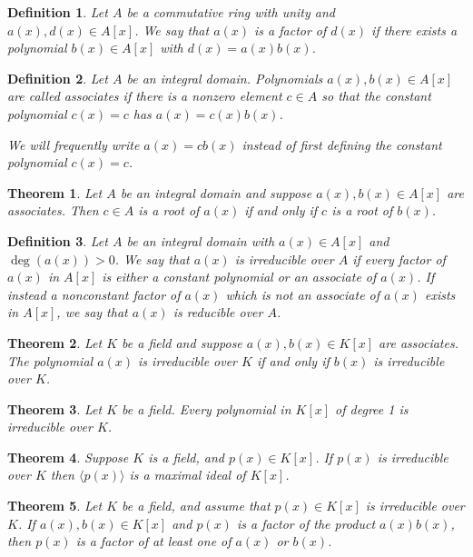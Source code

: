 \documentclass[letterpaper, 12pt]{article}
\newcommand{\pid}[1]{\langle #1 \rangle}
\newtheorem{defn}{Definition}
\newtheorem{thm}{Theorem}
\begin{document}
			\begin{defn}
			Let $A$ be a commutative ring with unity and $a(x), d(x) \in A[x]$. 
			We say that $a(x)$ is a factor of $d(x)$ if there exists a polynomial $b(x) \in A[x]$ with $d(x) = a(x)b(x)$.
			\end{defn}

			\setcounter{defn}{3}
			\begin{defn}
			Let $A$ be an integral domain. 
			Polynomials $a(x),b(x) \in A[x]$ are called associates if there is a nonzero element $c \in A$ so that the constant polynomial $c(x) = c$ has $a(x) = c(x)b(x)$.
			
			We will frequently write $a(x) = cb(x)$ instead of first defining the constant polynomial $c(x) = c$.
			\end{defn}

			\setcounter{thm}{4}
			\begin{thm}
			Let $A$ be an integral domain and suppose $a(x), b(x) \in A[x]$ are associates. 
			Then $c \in A$ is a root of $a(x)$ if and only if $c$ is a root of $b(x)$.
			\end{thm}

			\setcounter{defn}{6}
			\begin{defn}
			Let $A$ be an integral domain with $a(x) \in A[x]$ and $\deg(a(x))>0$.
			We say that $a(x)$ is irreducible over $A$ if every factor of $a(x)$ in $A[x]$ is either a constant polynomial or an associate of $a(x)$.
			If instead a nonconstant factor of $a(x)$ which is not an associate of $a(x)$ exists in $A[x]$, we say that $a(x)$ is reducible over $A$.
			\end{defn}

			\setcounter{thm}{7}
			\begin{thm}
			Let $K$ be a field and suppose $a(x), b(x) \in K[x]$ are associates. 
			The polynomial $a(x)$ is irreducible over $K$ if and only if $b(x)$ is irreducible over $K$.
			\end{thm}

			\begin{thm}
			Let $K$ be a field. 
			Every polynomial in $K[x]$ of degree 1 is irreducible over $K$.
			\end{thm}

			\begin{thm}
			Suppose $K$ is a field, and $p(x) \in K[x]$. 
			If $p(x)$ is irreducible over $K$ then $\pid{p(x)}$ is a maximal ideal of $K[x]$.
			\end{thm}

			\begin{thm}
			Let $K$ be a field, and assume that $p(x) \in K[x]$ is irreducible over $K$. 
			If $a(x), b(x) \in K[x]$ and $p(x)$ is a factor of the product $a(x)b(x)$, then $p(x)$ is a factor of at least one of $a(x)$ or $b(x)$.
			\end{thm}
\end{document}
